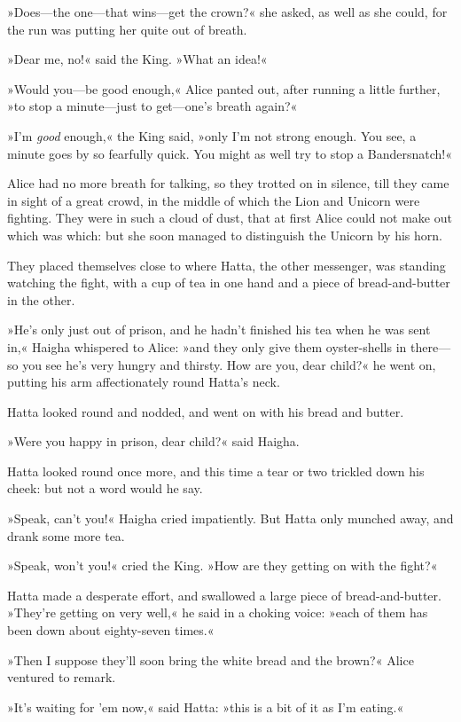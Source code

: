 »Does—the one—that wins—get the crown?« she asked, as well as she could, for the run was putting her quite out of breath.

»Dear me, no!« said the King. »What an idea!«

»Would you—be good enough,« Alice panted out, after running a little further, »to stop a minute—just to get—one's breath again?«

»I'm \textit{good} enough,« the King said, »only I'm not strong enough. You see, a minute goes by so fearfully quick. You might as well try to stop a Bandersnatch!«

Alice had no more breath for talking, so they trotted on in silence, till they came in sight of a great crowd, in the middle of which the Lion and Unicorn were fighting. They were in such a cloud of dust, that at first Alice could not make out which was which: but she soon managed to distinguish the Unicorn by his horn.

They placed themselves close to where Hatta, the other messenger, was standing watching the fight, with a cup of tea in one hand and a piece of bread-and-butter in the other.

»He's only just out of prison, and he hadn't finished his tea when he was sent in,« Haigha whispered to Alice: »and they only give them oyster-shells in there—so you see he's very hungry and thirsty. How are you, dear child?« he went on, putting his arm affectionately round Hatta's neck.

Hatta looked round and nodded, and went on with his bread and butter.

»Were you happy in prison, dear child?« said Haigha.

Hatta looked round once more, and this time a tear or two trickled down his cheek: but not a word would he say.

»Speak, can't you!« Haigha cried impatiently. But Hatta only munched away, and drank some more tea.

»Speak, won't you!« cried the King. »How are they getting on with the fight?«

Hatta made a desperate effort, and swallowed a large piece of bread-and-butter. »They're getting on very well,« he said in a choking voice: »each of them has been down about eighty-seven times.«

»Then I suppose they'll soon bring the white bread and the brown?« Alice ventured to remark.

»It's waiting for 'em now,« said Hatta: »this is a bit of it as I'm eating.«

